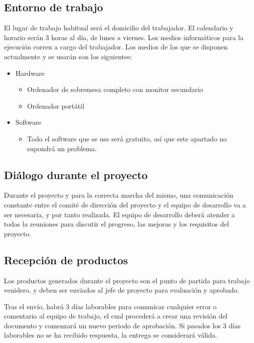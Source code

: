 		\subsection{Entorno de trabajo}

			El lugar de trabajo habitual será el domicilio del trabajador.
			El calendario y horario serán 3 horas al día, de lunes a viernes.
			Los medios informáticos para la ejecución corren a cargo del trabajador. Los medios de los que se disponen actualmente y se usarán son los siguientes: 

			\begin{itemize}
				\item Hardware
				\begin{itemize}
					\item Ordenador de sobremesa completo con monitor secundario
					\item Ordenador portátil
				\end{itemize}
				\item Software
				\begin{itemize}
					\item Todo el software que se use será gratuito, así que este apartado no supondrá un problema.
				\end{itemize}
			\end{itemize}

		\subsection{Diálogo durante el proyecto}

			Durante el proyecto y para la correcta marcha del mismo, una comunicación constante entre el comité de dirección del proyecto y el equipo de desarrollo va a ser necesaria, y por tanto realizada. El equipo de desarrollo deberá atender a todas la reuniones para discutir el progreso, las mejoras y los requisitos del proyecto.

		\subsection{Recepción de productos}

			Los productos generados durante el proyecto son el punto de partida para trabajo venidero, y deben ser enviados al jefe de proyecto para evaluación y aprobado.

			Tras el envío, habrá 3 días laborables para comunicar cualquier error o comentario al equipo de trabajo, el cual procederá a crear una revisión del documento y comenzará un nuevo periodo de aprobación. Si pasados los 3 días laborables no se ha recibido respuesta, la entrega se considerará válida.

